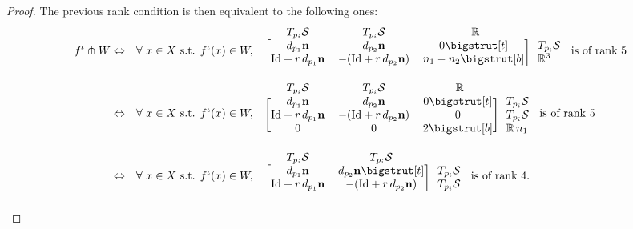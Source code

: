 \documentclass[11pt]{article}
\newcommand{\R}{\mathbb{R}}
\newcommand{\io}{\iota}
\newcommand{\nbf}{\mathbf{n}}
\newcommand{\Surf}{\mathcal{S}}
\newcommand{\Id}{\mathrm{Id}}
\newcommand\topstrut[1][1.2ex]{\setlength\bigstrutjot{#1}{\bigstrut[t]}}
\newcommand\botstrut[1][1.2ex]{\setlength\bigstrutjot{#1}{\bigstrut[b]}}
\theoremstyle{plain}
\theoremstyle{definition}
\theoremstyle{remark}
\begin{document}
\begin{proof}
		The previous rank condition is then equivalent to the following ones: 
		\begin{align*}
			f^\io \pitchfork W & \Leftrightarrow &\forall\ x \in X \text{ s.t. } f^\io(x) \in W, \quad & \begin{blockarray}{*{3}{c} l}
				\begin{block}{cccl}
					T_{p_i} \Surf & T_{p_i} \Surf & ~~\R~~ & \\
				\end{block}
				\begin{block}{[ccc] l}
					d_{p_1} \nbf & d_{p_2} \nbf & 0 \topstrut  & T_{p_i} \Surf \\
					\Id + r \, d_{p_1} \nbf & - (\Id + r \, d_{p_2} \nbf) & n_1 - n_2 \botstrut & \R^3 \\
				\end{block}
			\end{blockarray}
			\text{ is of rank } 5 \\
			& \Leftrightarrow & \forall\ x \in X \text{ s.t. } f^\io(x) \in W, \quad & \begin{blockarray}{*{3}{c} l}
				\begin{block}{cccl}
					T_{p_i} \Surf & T_{p_i} \Surf & ~~\R~~ & \\
				\end{block}
				\begin{block}{[ccc] l}
					d_{p_1} \nbf & d_{p_2} \nbf & 0 \topstrut  & T_{p_i} \Surf \\
					\Id + r \, d_{p_1} \nbf & - (\Id + r \, d_{p_2} \nbf) & 0 & T_{p_i} \Surf  \\
					0 & 0 & 2 \botstrut & \R \, n_1 \\
				\end{block}
			\end{blockarray}
			\text{ is of rank } 5 \\
			& \Leftrightarrow & \forall\ x \in X \text{ s.t. } f^\io(x) \in W, \quad & \begin{blockarray}{cc l}
				\begin{block}{ccl}
					T_{p_i} \Surf & T_{p_i} \Surf & \\
				\end{block}
				\begin{block}{[cc] l}
					d_{p_1} \nbf & d_{p_2} \nbf \topstrut  & T_{p_i} \Surf \\
					\Id + r \, d_{p_1} \nbf & - (\Id + r \, d_{p_2} \nbf) & T_{p_i} \Surf \\
				\end{block}
			\end{blockarray}
			\text{ is of rank } 4.
		\end{align*}
		

\end{proof}
\end{document}
